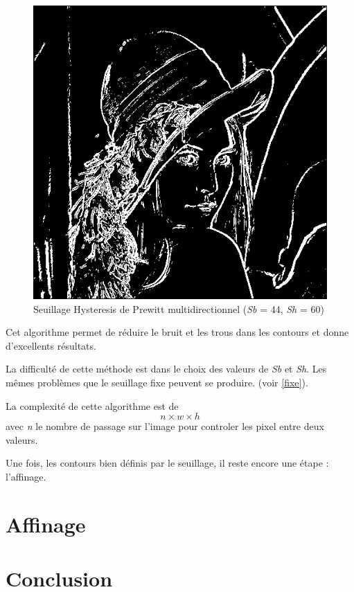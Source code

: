 \documentclass[11pt]{article}
\begin{document}
	\begin{figure}[H]
		\centering
		\includegraphics[scale=0.25]{Image/seuilHysteresis.png}
		\caption{Seuillage Hysteresis de Prewitt multidirectionnel	(\textit{Sb} = 44, \textit{Sh} = 60)}
		\label{fig:seuilHysteresis}
	\end{figure} 

	Cet algorithme permet de réduire le bruit et les trous dans les contours et donne d'excellents résultats.

	La difficulté de cette méthode est dans le choix des valeurs de \textit{Sb} et \textit{Sh}.
	Les mêmes problèmes que le seuillage fixe peuvent se produire. (voir \ref{fixe}).

	La complexité de cette algorithme est de \[n \times w \times h\]
	avec \textit{n} le nombre de passage sur l'image pour controler les pixel entre deux valeurs.

	Une fois, les contours bien définis par le seuillage, il reste encore une étape : l'affinage.


\section{Affinage}

\section{Conclusion}
\end{document}
